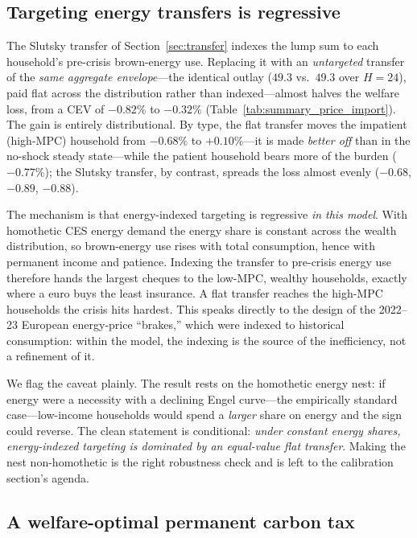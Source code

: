 \documentclass[11pt,a4paper]{article}
\begin{document}


\subsection{Targeting energy transfers is regressive}
\label{sec:flat}

The Slutsky transfer of Section~\ref{sec:transfer} indexes the lump sum to each
household's pre-crisis brown-energy use. Replacing it with an
\emph{untargeted} transfer of the \emph{same aggregate envelope}---the identical
outlay ($49.3$ vs.\ $49.3$ over $H=24$), paid flat across the distribution rather
than indexed---almost halves the welfare loss, from a CEV of $-0.82\%$ to
$-0.32\%$ (Table~\ref{tab:summary_price_import}). The gain is entirely
distributional. By type, the flat transfer moves the impatient (high-MPC)
household from $-0.68\%$ to $+0.10\%$---it is made \emph{better off} than in the
no-shock steady state---while the patient household bears more of the burden
($-0.77\%$); the Slutsky transfer, by contrast, spreads the loss almost evenly
($-0.68$, $-0.89$, $-0.88$).

The mechanism is that energy-indexed targeting is regressive \emph{in this
model}. With homothetic CES energy demand the energy share is constant across the
wealth distribution, so brown-energy use rises with total consumption, hence with
permanent income and patience. Indexing the transfer to pre-crisis energy use
therefore hands the largest cheques to the low-MPC, wealthy households, exactly
where a euro buys the least insurance. A flat transfer reaches the high-MPC
households the crisis hits hardest. This speaks directly to the design of the
2022--23 European energy-price ``brakes,'' which were indexed to historical
consumption: within the model, the indexing is the source of the inefficiency,
not a refinement of it.

We flag the caveat plainly. The result rests on the homothetic energy nest: if
energy were a necessity with a declining Engel curve---the empirically standard
case---low-income households would spend a \emph{larger} share on energy and the
sign could reverse. The clean statement is conditional: \emph{under constant
energy shares, energy-indexed targeting is dominated by an equal-value flat
transfer}. Making the nest non-homothetic is the right robustness check and is
left to the calibration section's agenda.

\subsection{A welfare-optimal permanent carbon tax}
\label{sec:carbontax}
\end{document}
